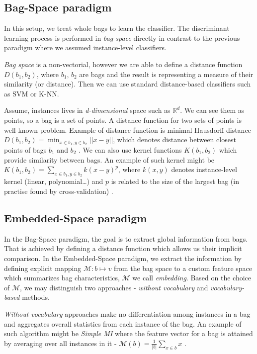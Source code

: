 \subsection{Bag-Space paradigm}
In this setup, we treat whole bags to learn the classifier. The discriminant learning process is performed in \emph{bag space} directly in contrast to the previous paradigm where we assumed instance-level classifiers.

\emph{Bag space} is a non-vectorial, however we are able to define a distance function $D(b_1,b_2)$, where $b_1$, $b_2$ are bags and the result is representing a measure of their similarity (or distance). Then we can use standard distance-based classifiers such as SVM or K-NN.

Assume, instances lives in \emph{d-dimensional} space such as $\mathbb{R}^{d}$. We can see them as points, so a bag is a set of points. A distance function for two sets of points is well-known problem. Example of distance function is minimal Hausdorff distance $D(b_1,b_2)=\min_{x\in b_1, y\in b_2}||x-y||$, which denotes distance between closest points of bags $b_1$ and $b_2$ \cite{Wang2000}. We can also use kernel functions $K(b_1,b_2)$ which provide similarity between bags. An example of such kernel might be $K(b_1,b_2)=\sum_{x\in b_1, y\in b_2}k(x-y)^{p}$, where $k(x,y)$ denotes instance-level kernel (linear, polynomial\dots) and $p$ is related to the size of the largest bag (in practise found by cross-validation) \cite{Gartner2002}.

\subsection{Embedded-Space paradigm}
In the Bag-Space paradigm, the goal is to extract global information from bags. That is achieved by defining a distance function which allows us their implicit comparison. In the Embedded-Space paradigm, we extract the information by defining explicit mapping $\mathcal{M}:b\mapsto v$ from the bag space to a custom feature space which summarizes bag characteristics,  $\mathcal{M}$ we call \emph{embedding}. Based on the choice of $\mathcal{M}$, we may distinguish two approaches - \emph{without vocabulary} and \emph{vocabulary-based} methods.

\emph{Without vocabulary} approaches make no differentiation among instances in a bag and aggregates overall statistics from each instance of the bag. An example of such algorithm might be \emph{Simple MI} where the feature vector for a bag is attained by averaging over all instances in it - $\mathcal{M}(b)=\frac{1}{|b|}\sum_{x\in b}x$ \cite{Dong2006}.


